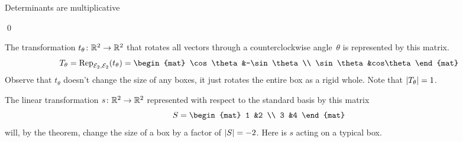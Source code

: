 \begin{frame}{Determinants are multiplicative}
\th[th:MatChVolByDetMat]%

\pause
\pf
{}

\pause
{}
\end{frame}
\begin{frame}
\qed
\end{frame}
\begin{frame}
\ex
The transformation $\mbox{$t_{\theta}\colon \mathbb{R}^2\to \mathbb{R}^2$}$ 
that rotates all vectors through a counterclockwise
angle~$\theta$ is represented 
by this matrix.
\begin{equation*}
  T_\theta=
  \rep{t_\theta}{\stdbasis_2,\stdbasis_2}
  =
  \begin{mat}
    \cos\theta  &-\sin\theta \\
    \sin\theta  &cos\theta
  \end{mat}
\end{equation*}
Observe that $t_\theta$ doesn't change the size of any boxes, it just rotates 
the entire box as a rigid whole.
Note that $\deter{T_\theta}=1$.

\pause
\ex The linear transformation $\mbox{$s\colon \mathbb{R}^2\to \mathbb{R}^2$}$
represented with respect to the standard basis by this matrix
\begin{equation*}
  S=
  \begin{mat}
    1 &2 \\
    3 &4
  \end{mat}
\end{equation*}
will, by the theorem, change the size of a box by a factor of $\deter{S}=-2$.
Here is $s$ acting on a typical box. 
\end{frame}
